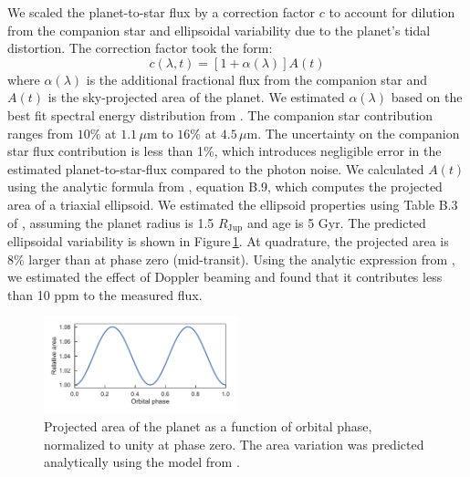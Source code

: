 \documentclass[twocolumn]{aastex61}
\begin{document}
We scaled the planet-to-star flux by a correction factor $c$ to account for dilution from the companion star and ellipsoidal variability due to the planet's tidal distortion. The correction factor took the form: 
\begin{equation}
	c(\lambda, t) = [1 + \alpha(\lambda)]A(t)
\end{equation}
where $\alpha(\lambda)$ is the additional fractional flux from the companion star and $A(t)$ is the sky-projected area of the planet. We estimated $\alpha(\lambda)$ based on the best fit spectral energy distribution from \cite{cartier17}. The companion star contribution ranges from $10\%$ at $1.1\,\mu$m to $16\%$ at $4.5\,\mu$m. The uncertainty on the companion star flux contribution is less than 1\%, which introduces negligible error in the estimated planet-to-star-flux compared to the photon noise.   We calculated $A(t)$ using the analytic formula from \cite{leconte11b}, equation B.9, which computes the projected area of a triaxial ellipsoid. We estimated the ellipsoid properties using Table B.3 of \cite{leconte11a}, assuming the planet radius is 1.5 $R_\mathrm{Jup}$ and age is 5 Gyr. The predicted ellipsoidal variability is shown in Figure\,\ref{fig:ellipsoidal}. At quadrature, the projected area is $8\%$ larger than at phase zero (mid-transit). Using the analytic expression from \cite{loeb03}, we estimated the effect of Doppler beaming and found that it contributes less than 10 ppm to the measured flux. 

\begin{figure}
\includegraphics[width = 0.5\textwidth]{Figures/ellipsoidal.pdf}
\caption{Projected area of the planet as a function of orbital phase, normalized to unity at phase zero. The area variation was predicted analytically using the model from \cite{leconte11b}.}
\label{fig:ellipsoidal}
\end{figure}
\end{document}
